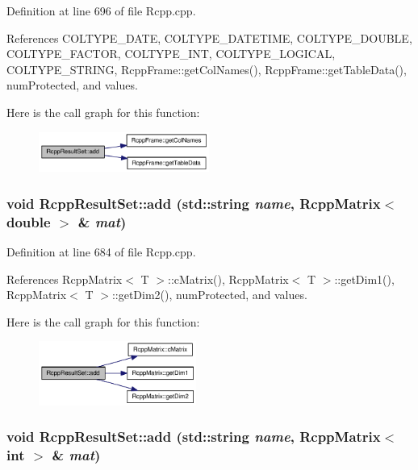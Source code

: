 Definition at line 696 of file Rcpp.cpp.

References COLTYPE\_\-DATE, COLTYPE\_\-DATETIME, COLTYPE\_\-DOUBLE, COLTYPE\_\-FACTOR, COLTYPE\_\-INT, COLTYPE\_\-LOGICAL, COLTYPE\_\-STRING, RcppFrame::getColNames(), RcppFrame::getTableData(), numProtected, and values.

Here is the call graph for this function:\nopagebreak
\begin{figure}[H]
\begin{center}
\leavevmode
\includegraphics[width=158pt]{classRcppResultSet_9e05fb2ca92258529ffbb536e23a2a4d_cgraph}
\end{center}
\end{figure}
\hypertarget{classRcppResultSet_f6f50ca0a589fc12ef68c0406e83243b}{
\subsubsection[{add}]{\setlength{\rightskip}{0pt plus 5cm}void RcppResultSet::add (std::string {\em name}, \/  {\bf RcppMatrix}$<$ double $>$ \& {\em mat})}}
\label{classRcppResultSet_f6f50ca0a589fc12ef68c0406e83243b}




Definition at line 684 of file Rcpp.cpp.

References RcppMatrix$<$ T $>$::cMatrix(), RcppMatrix$<$ T $>$::getDim1(), RcppMatrix$<$ T $>$::getDim2(), numProtected, and values.

Here is the call graph for this function:\nopagebreak
\begin{figure}[H]
\begin{center}
\leavevmode
\includegraphics[width=146pt]{classRcppResultSet_f6f50ca0a589fc12ef68c0406e83243b_cgraph}
\end{center}
\end{figure}
\hypertarget{classRcppResultSet_56f1bff720a6cf6503ab942bdb6892b3}{
\subsubsection[{add}]{\setlength{\rightskip}{0pt plus 5cm}void RcppResultSet::add (std::string {\em name}, \/  {\bf RcppMatrix}$<$ int $>$ \& {\em mat})}}
\label{classRcppResultSet_56f1bff720a6cf6503ab942bdb6892b3}




